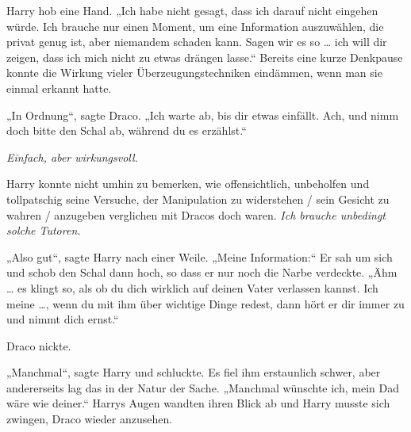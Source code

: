 Harry hob eine Hand.
„Ich habe nicht gesagt, dass ich darauf nicht eingehen würde. Ich brauche nur einen Moment, um eine Information auszuwählen, die privat genug ist, aber niemandem schaden kann. Sagen wir es so … ich will dir zeigen, dass ich mich nicht zu etwas drängen lasse.“ Bereits eine kurze Denkpause konnte die Wirkung vieler Überzeugungstechniken eindämmen, wenn man sie einmal erkannt hatte.

„In Ordnung“, sagte Draco.
„Ich warte ab, bis dir etwas einfällt. Ach, und nimm doch bitte den Schal ab, während du es erzählst.“

\emph{Einfach, aber wirkungsvoll.}

Harry konnte nicht umhin zu bemerken, wie offensichtlich, unbeholfen und tollpatschig seine Versuche, der Manipulation zu widerstehen / sein Gesicht zu wahren / anzugeben verglichen mit Dracos doch waren. \emph{Ich brauche unbedingt solche Tutoren.}

„Also gut“, sagte Harry nach einer Weile.
„Meine Information:“ Er sah um sich und schob den Schal dann hoch, so dass er nur noch die Narbe verdeckte. „Ähm … es klingt so, als ob du dich wirklich auf deinen Vater verlassen kannst. Ich meine …, wenn du mit ihm über wichtige Dinge redest, dann hört er dir immer zu und nimmt dich ernst.“

Draco nickte.

„Manchmal“, sagte Harry und schluckte. Es fiel ihm erstaunlich schwer, aber andererseits lag das in der Natur der Sache.
„Manchmal wünschte ich, mein Dad wäre wie deiner.“ Harrys Augen wandten ihren Blick ab und Harry musste sich zwingen, Draco wieder anzusehen.

